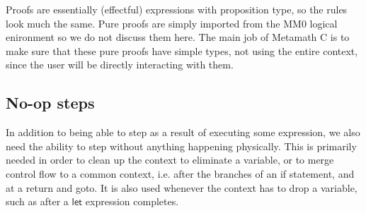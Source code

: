 \documentclass[acmsmall,nonacm]{acmart}
\DeclareMathOperator*{\Sep}{\scalerel*{\ast}{\sum}}
\newcommand{\wand}{\mathrel{-\!\!\ast}}
\newcommand{\proves}{\vdash}
\newcommand{\makes}{\dashv}
\begin{document}

Proofs are essentially (effectful) expressions with proposition type, so the rules look much the same. Pure proofs are simply imported from the MM0 logical enironment so we do not discuss them here. The main job of Metamath C is to make sure that these pure proofs have simple types, not using the entire context, since the user will be directly interacting with them.

\subsection{No-op steps}\label{sec:noop}

In addition to being able to step as a result of executing some expression, we also need the ability to step without anything happening physically. This is primarily needed in order to clean up the context to eliminate a variable, or to merge control flow to a common context, i.e. after the branches of an \textsf{if} statement, and at a \textsf{return} and \textsf{goto}. It is also used whenever the context has to drop a variable, such as after a $\mathsf{let}$ expression completes.
\end{document}
